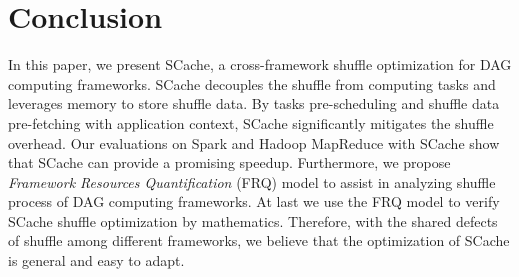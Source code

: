 \section{Conclusion}
In this paper, we present SCache, a cross-framework shuffle optimization for DAG computing frameworks. 
SCache decouples the shuffle from computing tasks and leverages memory to store shuffle data. 
By tasks pre-scheduling and shuffle data pre-fetching with application context, SCache significantly mitigates the shuffle overhead. 
{\color{blue}
Our evaluations on Spark and Hadoop MapReduce with SCache show that SCache can provide a promising speedup. 
Furthermore, we propose \textit{Framework Resources Quantification} (FRQ) model to assist in analyzing shuffle process of DAG computing frameworks. At last we use the FRQ model to verify SCache shuffle optimization by mathematics.
Therefore, with the shared defects of shuffle among different frameworks, we believe that the optimization of SCache is general and easy to adapt. 
}
